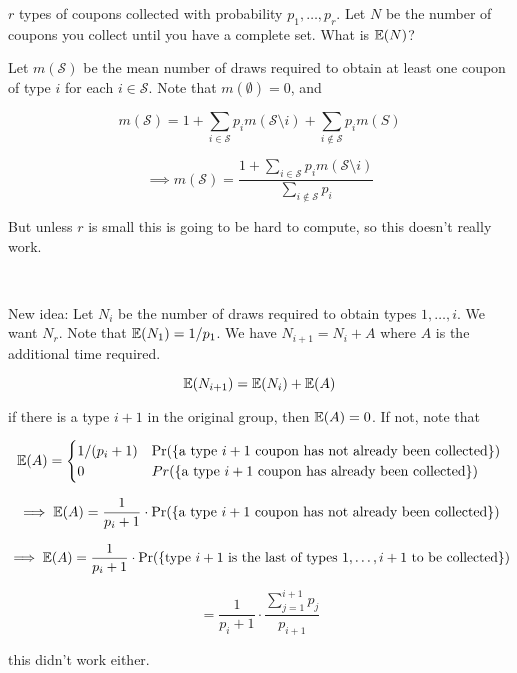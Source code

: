 \begin{example} \(r\) types of coupons collected with probability \(p_1, \ldots, p_r\). Let \(N\) be the number of coupons you collect until you have a complete set. What is \(\E(N)\)?

\begin{solution} Let \(m(\mathcal{S})\) be the mean number of draws required to obtain at least one coupon of type \(i\) for each \(i \in \mathcal{S}\). Note that \(m(\emptyset) =0\), and

\[
m(\mathcal{S} ) =  1 + \sum_{i \in \mathcal{S}} p_i  m(\mathcal{S} \setminus i) + \sum_{i \notin \mathcal{S} } p_i m(S)
\]

\[
\implies m(\mathcal{S}) = \frac{1 + \sum_{i \in \mathcal{S}} p_i  m(\mathcal{S} \setminus i) }{\sum_{i \notin \mathcal{S} } p_i }
\]

But unless \(r\) is small this is going to be hard to compute, so this doesn't really work.

\

\end{solution}

\begin{solution}
New idea: Let \(N_i\) be the number of draws required to obtain types \(1, \ldots, i\). We want \(N_r\). Note that \(\E(N_1) = 1/p_1\). We have \(N_{i+1} = N_i + A\) where \(A\) is the additional time required. 

\[
\E(N_{i+1}) = \E(N_i) + \E(A)
\]

if there is a type \(i +1\) in the original group, then \(\E(A) =0\). If not, note that

\[
\E(A) = \begin{cases}
1/(p_i + 1) & \Pr(\{\text{a type } i +1 \text{ coupon has not already been collected}\}) \\
0 & Pr(\{\text{a type } i +1 \text{ coupon has already been collected}\})
\end{cases}
\]

\[
\implies \E(A) = \frac{1}{p_i + 1} \cdot \Pr(\{\text{a type } i +1 \text{ coupon has not already been collected}\})
\]

\[
\implies \E(A) = \frac{1}{p_i + 1} \cdot \Pr(\{\text{type } i +1 \text{ is the last of types } 1, \ldots, i+1 \text{ to be collected}\})
\]

\[
= \frac{1}{p_i + 1} \cdot  \frac{\sum_{j=1}^{i+1} p_j}{p_{i+1}}
\]

this didn't work either.


\end{solution}
\end{example}

